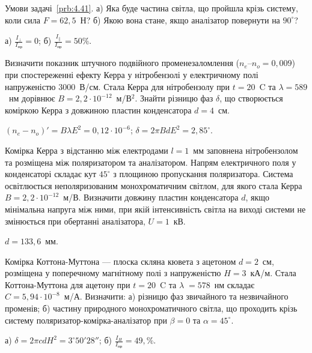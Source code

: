 \begin{problem}%
    Умови задачі~\ref{prb:4.41}. а) Яка буде частина світла, що пройшла крізь
    систему, коли сила $ F = 62,5 $~Н? б) Якою вона стане, якщо аналізатор
    повернути на $ 90^\circ $?
    \begin{solution}
         а)  $ \frac{I_\perp}{I_\text{пр}} = 0 $; б) $\frac{I_\parallel}{I_\text{пр}} = 50\% $.
    \end{solution}
\end{problem}

\begin{problem}%
     Визначити показник штучного подвійного променезаломлення ($ n_e – n_o = 0,009 $) при спостереженні ефекту Керра у нітробензолі у електричному полі напруженістю $ 3000 $~В/см. Стала Керра для нітробензолу при $ t = 20$~\textdegree C  та $ \lambda = 589 $~нм дорівнює $ B = 2,2\cdot10^{-12} $~м/В$^2$. Знайти різницю фаз $ \delta $, що створюється коміркою Керра з довжиною пластин конденсатора $ d = 4 $~см.
    \begin{solution}
        $ (n_e - n_o)' = B\lambda E^2 = 0,12 \cdot 10^{-6} $; $ \delta = 2\pi BdE^2 = 2,85^\circ $.
    \end{solution}
\end{problem}

\begin{problem}%
    Комірка Керра з відстанню між електродами $ l = 1 $~мм заповнена нітробензолом та розміщена між поляризатором та аналізатором. Напрям електричного поля у конденсаторі складає кут $ 45^\circ $ з площиною пропускання поляризатора. Система освітлюється неполяризованим монохроматичним світлом, для якого стала Керра $ B = 2,2\cdot10^{-12} $~м/В. Визначити довжину пластин конденсатора $ d $, якщо мінімальна напруга між ними, при якій інтенсивність світла на виході системи не змінюється при обертанні аналізатора, $ U = 1 $~кВ.
    \begin{solution}
        $ d = 133,6 $~мм.
    \end{solution}
\end{problem}

\begin{problem}%
     Комірка Коттона-Муттона --- плоска скляна кювета з ацетоном $ d = 2 $~см, розміщена у поперечному магнітному полі з напруженістю $ H = 3 $~кА/м. Стала Коттона-Муттона для ацетону при $ t = 20 $~\textdegree C та $ \lambda= 578 $~нм складає $ C = 5,94\cdot10^{-8} $~м/А. Визначити: а) різницю фаз звичайного та незвичайного променів; б) частину природного монохроматичного світла, що проходить крізь систему поляризатор-комірка-аналізатор при $ \beta = 0 $ та $ \alpha = 45^\circ $.
    \begin{solution}
        а) $ \delta = 2\pi cdH^2 = 3^\circ50'28'' $; б) $ \frac{I_H}{I_\text{пр}} = 49,\% $.
    \end{solution}
\end{problem}

